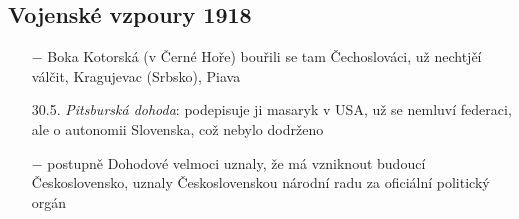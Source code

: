 \documentclass{article}
\begin{document}
\subsection*{Vojenské vzpoury 1918}
\begin{itemize}
    \vspace{-0.5em}
    \setlength\itemsep{0.15em}
    \item[$-$] Boka Kotorská (v Černé Hoře) bouřili se tam Čechoslováci, už nechtjěí válčit, Kragujevac (Srbsko), Piava
    \item[30.5.] \textit{Pitsburská dohoda}: podepisuje ji masaryk v USA, už se nemluví federaci, ale o autonomii Slovenska, což nebylo dodrženo
    \item[$-$] postupně Dohodové velmoci uznaly, že má vzniknout budoucí Československo, uznaly Československou národní radu za oficiální politický orgán
\end{itemize}
\end{document}
